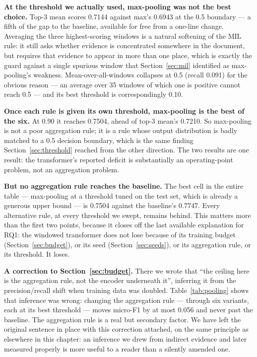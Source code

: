 \textbf{At the threshold we actually used, max-pooling was not the best choice.} Top-3 mean scores 0.7144 against max's 0.6943 at the 0.5 boundary --- a fifth of the gap to the baseline, available for free from a one-line change. Averaging the three highest-scoring windows is a natural softening of the MIL rule: it still asks whether evidence is concentrated somewhere in the document, but requires that evidence to appear in more than one place, which is exactly the guard against a single spurious window that Section~\ref{sec:mil} identified as max-pooling's weakness. Mean-over-all-windows collapses at 0.5 (recall 0.091) for the obvious reason --- an average over 35 windows of which one is positive cannot reach 0.5 --- and its best threshold is correspondingly 0.10.

\textbf{Once each rule is given its own threshold, max-pooling is the best of the six.} At 0.90 it reaches 0.7504, ahead of top-3 mean's 0.7210. So max-pooling is not a poor aggregation rule; it is a rule whose output distribution is badly matched to a 0.5 decision boundary, which is the same finding Section~\ref{sec:threshold} reached from the other direction. The two results are one result: the transformer's reported deficit is substantially an operating-point problem, not an aggregation problem.

\textbf{But no aggregation rule reaches the baseline.} The best cell in the entire table --- max-pooling at a threshold tuned on the test set, which is already a generous upper bound --- is 0.7504 against the baseline's 0.7747. Every alternative rule, at every threshold we swept, remains behind. This matters more than the first two points, because it closes off the last available explanation for RQ1: the windowed transformer does not lose because of its training budget (Section~\ref{sec:budget}), or its seed (Section~\ref{sec:seeds}), or its aggregation rule, or its threshold. It loses.

\textbf{A correction to Section~\ref{sec:budget}.} There we wrote that ``the ceiling here is the aggregation rule, not the encoder underneath it'', inferring it from the precision/recall shift when training data was doubled. Table~\ref{tab:pooling} shows that inference was wrong: changing the aggregation rule --- through six variants, each at its best threshold --- moves micro-F1 by at most 0.056 and never past the baseline. The aggregation rule is a real but secondary factor. We have left the original sentence in place with this correction attached, on the same principle as elsewhere in this chapter: an inference we drew from indirect evidence and later measured properly is more useful to a reader than a silently amended one.

